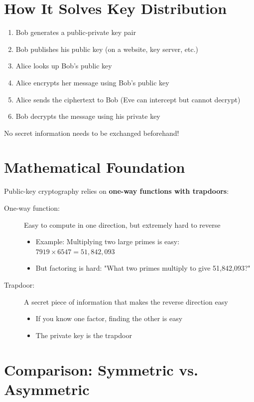 \documentclass[11pt,a4paper]{report}
\begin{document}
\section{How It Solves Key Distribution}

\begin{enumerate}
\item Bob generates a public-private key pair
\item Bob publishes his public key (on a website, key server, etc.)
\item Alice looks up Bob's public key
\item Alice encrypts her message using Bob's public key
\item Alice sends the ciphertext to Bob (Eve can intercept but cannot decrypt)
\item Bob decrypts the message using his private key
\end{enumerate}

No secret information needs to be exchanged beforehand!

\section{Mathematical Foundation}

Public-key cryptography relies on \textbf{one-way functions with trapdoors}:

\begin{description}
\item[One-way function:] Easy to compute in one direction, but extremely hard to reverse
   \begin{itemize}
   \item Example: Multiplying two large primes is easy: $7919 \times 6547 = 51,842,093$
   \item But factoring is hard: "What two primes multiply to give 51,842,093?"
   \end{itemize}

\item[Trapdoor:] A secret piece of information that makes the reverse direction easy
   \begin{itemize}
   \item If you know one factor, finding the other is easy
   \item The private key is the trapdoor
   \end{itemize}
\end{description}

\section{Comparison: Symmetric vs. Asymmetric}
\end{document}
